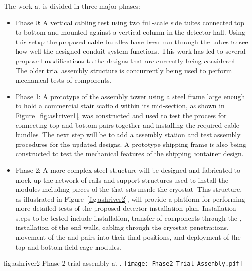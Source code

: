 The work at  is divided in three major phases:
\begin{itemize}
  \item {Phase 0:} A vertical cabling test using two full-scale 
          side tubes connected top to bottom and mounted 
         against a vertical column in the detector hall.  Using this 
         setup the proposed cable bundles have been run through the 
         tubes to see how well the designed conduit system functions.
         This work has led to several proposed modifications to the 
         designs that are currently being considered.  The older 
          trial assembly structure is concurrently 
         being used to perform mechanical tests of  
         components. 
  \item {Phase 1:} A prototype of the   
         assembly tower using a steel frame large enough to hold a 
         commercial stair scaffold within its mid-section, as shown 
         in Figure~\ref{fig:ashriver1}, was constructed and %
        used to test the process for connecting top 
         and bottom  pairs together and installing the 
         required cable bundles.  The next step will be to add a
          assembly station and test assembly procedures 
         for the updated  designs.  A prototype 
          shipping frame is also being constructed to 
         test the mechanical features of the shipping container 
         design.  
  \item {Phase 2:} A more complex steel structure will be 
         designed and fabricated to mock up the network of rails 
         and support structures used to install the 
          modules including pieces of the  that 
         sits inside the cryostat.  This structure, as 
         illustrated in Figure~\ref{fig:ashriver2}, will provide 
         a platform for performing more detailed tests of the 
         proposed detector installation plan.  Installation steps 
         to be tested include  installation, transfer 
         of  components through the , 
         installation of the  end walls, cabling 
         through the cryostat penetrations, movement of the 
          and   pairs into their final 
         positions, and deployment of the top and bottom field 
         cage modules.
\end{itemize}
\begin{dunefigure}{fig:ashriver2}
  {Phase 2 trial assembly at .}
  \texttt{[image: Phase2\_Trial\_Assembly.pdf]}
\end{dunefigure}

